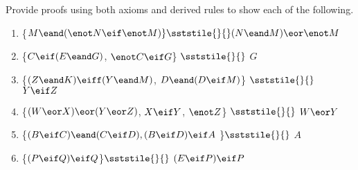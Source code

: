 \noindent\problempart
Provide proofs using both axioms and derived rules to show each of the following.
\begin{enumerate}[label=(\arabic*)]
\item \{$M \eand (\enot N \eif \enot M) \} \sststile{}{} (N \eand M) \eor \enot M$




\item \{$C\eif(E\eand G)$, $\enot C \eif G$\} $\sststile{}{}$ $G$
\item \{$(Z\eand K)\eiff(Y\eand M)$, $D\eand(D\eif M)$\} $\sststile{}{}$ $Y\eif Z$




\item \{$(W \eor X) \eor (Y \eor Z)$, $X\eif Y$, $\enot Z$\} $\sststile{}{}$ $W\eor Y$
\item \{$(B \eif C) \eand (C \eif D), (B \eif D) \eif A $ \}$ \sststile{}{}$ $A$



\item \{$ (P \eif Q) \eif Q $\}$ \sststile{}{} $ $(E \eif P) \eif P$

\end{enumerate}

